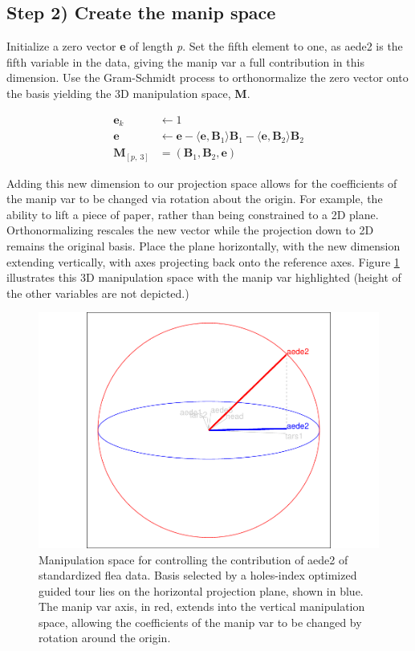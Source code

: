 \hypertarget{step-2-create-the-manip-space}{%
\subsection{Step 2) Create the manip
space}\label{step-2-create-the-manip-space}}

Initialize a zero vector \textbf{e} of length \emph{p}. Set the fifth
element to one, as aede2 is the fifth variable in the data, giving the
manip var a full contribution in this dimension. Use the Gram-Schmidt
process to orthonormalize the zero vector onto the basis yielding the 3D
manipulation space, \textbf{M}.

\begin{align*}
  \textbf{e}_k &\leftarrow 1 \\ 
  \textbf{e}   &\leftarrow \textbf{e} - \langle \textbf{e}, \textbf{B}_1 \rangle \textbf{B}_1 - \langle \textbf{e}, \textbf{B}_2 \rangle \textbf{B}_2 \\ 
  \textbf{M}_{[p,~3]} &= (\textbf{B}_1,\textbf{B}_2,\textbf{e})
\end{align*}

Adding this new dimension to our projection space allows for the
coefficients of the manip var to be changed via rotation about the
origin. For example, the ability to lift a piece of paper, rather than
being constrained to a 2D plane. Orthonormalizing rescales the new
vector while the projection down to 2D remains the original basis. Place
the plane horizontally, with the new dimension extending vertically,
with axes projecting back onto the reference axes. Figure
\ref{fig:step2} illustrates this 3D manipulation space with the manip
var highlighted (height of the other variables are not depicted.)

\begin{Schunk}
\begin{figure}

{\centering \includegraphics[width=0.7\linewidth]{spinifex_paper_files/figure-latex/step2-1} 

}

\caption[Manipulation space for controlling the contribution of aede2 of standardized flea data]{Manipulation space for controlling the contribution of aede2 of standardized flea data. Basis selected by a holes-index optimized guided tour lies on the horizontal projection plane, shown in blue. The manip var axis, in red, extends into the vertical manipulation space, allowing the coefficients of the manip var to be changed by rotation around the origin.}\label{fig:step2}
\end{figure}
\end{Schunk}

